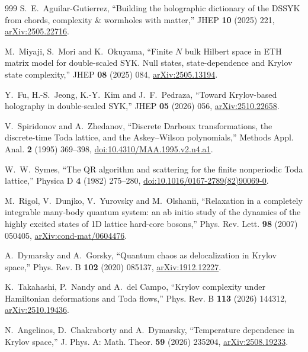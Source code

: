 \documentclass[a4paper,11pt]{article}
\theoremstyle{definition}
\theoremstyle{remark}
\begin{document}
\begin{thebibliography}{999}
S.~E.~Aguilar-Gutierrez,
``Building the holographic dictionary of the DSSYK from chords, complexity \& wormholes with matter,''
JHEP \textbf{10} (2025) 221,
\href{https://arxiv.org/abs/2505.22716}{arXiv:2505.22716}.

M.~Miyaji, S.~Mori and K.~Okuyama,
``Finite $N$ bulk Hilbert space in ETH matrix model for double-scaled SYK. Null states, state-dependence and Krylov state complexity,''
JHEP \textbf{08} (2025) 084,
\href{https://arxiv.org/abs/2505.13194}{arXiv:2505.13194}.

Y.~Fu, H.-S.~Jeong, K.-Y.~Kim and J.~F.~Pedraza,
``Toward Krylov-based holography in double-scaled SYK,''
JHEP \textbf{05} (2026) 056,
\href{https://arxiv.org/abs/2510.22658}{arXiv:2510.22658}.

V.~Spiridonov and A.~Zhedanov,
``Discrete Darboux transformations, the discrete-time Toda lattice, and the Askey--Wilson polynomials,''
Methods Appl. Anal. \textbf{2} (1995) 369--398,
\href{https://doi.org/10.4310/MAA.1995.v2.n4.a1}{doi:10.4310/MAA.1995.v2.n4.a1}.

W.~W.~Symes,
``The QR algorithm and scattering for the finite nonperiodic Toda lattice,''
Physica D \textbf{4} (1982) 275--280,
\href{https://doi.org/10.1016/0167-2789(82)90069-0}{doi:10.1016/0167-2789(82)90069-0}.

M.~Rigol, V.~Dunjko, V.~Yurovsky and M.~Olshanii,
``Relaxation in a completely integrable many-body quantum system: an ab initio study of the
dynamics of the highly excited states of 1D lattice hard-core bosons,''
Phys. Rev. Lett. \textbf{98} (2007) 050405,
\href{https://arxiv.org/abs/cond-mat/0604476}{arXiv:cond-mat/0604476}.

A.~Dymarsky and A.~Gorsky,
``Quantum chaos as delocalization in Krylov space,''
Phys. Rev. B \textbf{102} (2020) 085137,
\href{https://arxiv.org/abs/1912.12227}{arXiv:1912.12227}.

K.~Takahashi, P.~Nandy and A.~del Campo,
``Krylov complexity under Hamiltonian deformations and Toda flows,''
Phys. Rev. B \textbf{113} (2026) 144312,
\href{https://arxiv.org/abs/2510.19436}{arXiv:2510.19436}.

N.~Angelinos, D.~Chakraborty and A.~Dymarsky,
``Temperature dependence in Krylov space,''
J. Phys. A: Math. Theor. \textbf{59} (2026) 235204,
\href{https://arxiv.org/abs/2508.19233}{arXiv:2508.19233}.


\end{thebibliography}
\end{document}
